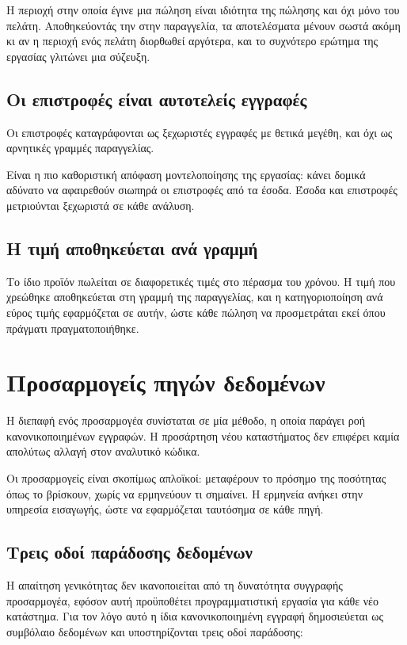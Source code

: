 Η περιοχή στην οποία έγινε μια πώληση είναι ιδιότητα της πώλησης και όχι μόνο
του πελάτη. Αποθηκεύοντάς την στην παραγγελία, τα αποτελέσματα μένουν σωστά
ακόμη κι αν η περιοχή ενός πελάτη διορθωθεί αργότερα, και το συχνότερο ερώτημα
της εργασίας γλιτώνει μια σύζευξη.

\subsection{Οι επιστροφές είναι αυτοτελείς εγγραφές}

Οι επιστροφές καταγράφονται ως ξεχωριστές εγγραφές με θετικά μεγέθη, και όχι ως
αρνητικές γραμμές παραγγελίας.

Είναι η πιο καθοριστική απόφαση μοντελοποίησης της εργασίας: κάνει δομικά
αδύνατο να αφαιρεθούν σιωπηρά οι επιστροφές από τα έσοδα. Έσοδα και επιστροφές
μετριούνται ξεχωριστά σε κάθε ανάλυση.

\subsection{Η τιμή αποθηκεύεται ανά γραμμή}

Το ίδιο προϊόν πωλείται σε διαφορετικές τιμές στο πέρασμα του χρόνου. Η τιμή
που χρεώθηκε αποθηκεύεται στη γραμμή της παραγγελίας, και η κατηγοριοποίηση ανά
εύρος τιμής εφαρμόζεται σε αυτήν, ώστε κάθε πώληση να προσμετράται εκεί όπου
πράγματι πραγματοποιήθηκε.

\section{Προσαρμογείς πηγών δεδομένων}
\label{sec:adapters}

Η διεπαφή ενός προσαρμογέα συνίσταται σε μία μέθοδο, η οποία παράγει ροή
κανονικοποιημένων εγγραφών. Η προσάρτηση νέου καταστήματος δεν επιφέρει καμία
απολύτως αλλαγή στον αναλυτικό κώδικα.

Οι προσαρμογείς είναι σκοπίμως απλοϊκοί: μεταφέρουν το πρόσημο της ποσότητας
όπως το βρίσκουν, χωρίς να ερμηνεύουν τι σημαίνει. Η ερμηνεία ανήκει στην
υπηρεσία εισαγωγής, ώστε να εφαρμόζεται ταυτόσημα σε κάθε πηγή.

\subsection{Τρεις οδοί παράδοσης δεδομένων}
\label{sec:delivery-routes}

Η απαίτηση γενικότητας δεν ικανοποιείται από τη δυνατότητα συγγραφής
προσαρμογέα, εφόσον αυτή προϋποθέτει προγραμματιστική εργασία για κάθε νέο
κατάστημα. Για τον λόγο αυτό η ίδια κανονικοποιημένη εγγραφή δημοσιεύεται ως
συμβόλαιο δεδομένων και υποστηρίζονται τρεις οδοί παράδοσης:

